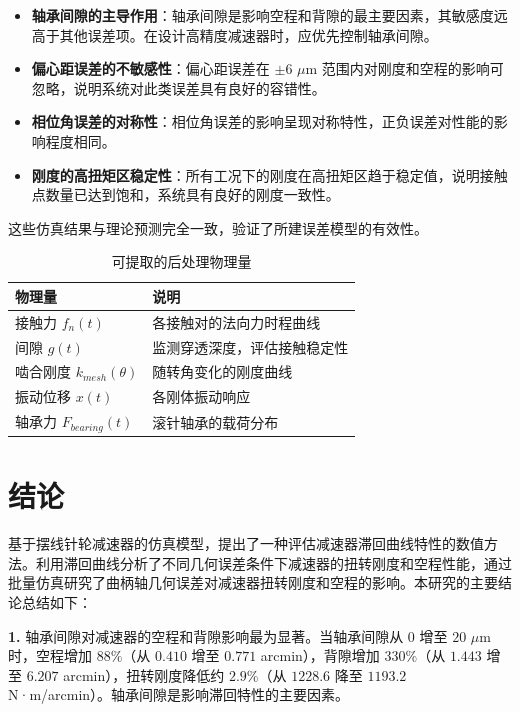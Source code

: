 \documentclass[12pt]{ctexart}
\begin{document}
\begin{itemize}
    \item \textbf{轴承间隙的主导作用}：轴承间隙是影响空程和背隙的最主要因素，其敏感度远高于其他误差项。在设计高精度减速器时，应优先控制轴承间隙。

    \item \textbf{偏心距误差的不敏感性}：偏心距误差在 $\pm 6$ $\mu$m 范围内对刚度和空程的影响可忽略，说明系统对此类误差具有良好的容错性。

    \item \textbf{相位角误差的对称性}：相位角误差的影响呈现对称特性，正负误差对性能的影响程度相同。

    \item \textbf{刚度的高扭矩区稳定性}：所有工况下的刚度在高扭矩区趋于稳定值，说明接触点数量已达到饱和，系统具有良好的刚度一致性。
\end{itemize}

这些仿真结果与理论预测完全一致，验证了所建误差模型的有效性。

\begin{table}[htbp]
\centering
\small
\begin{tabular}{lp{9cm}}
\toprule
物理量 & 说明 \\
\midrule
接触力 $f_n(t)$ & 各接触对的法向力时程曲线 \\
间隙 $g(t)$ & 监测穿透深度，评估接触稳定性 \\
啮合刚度 $k_{mesh}(\theta)$ & 随转角变化的刚度曲线 \\
振动位移 $x(t)$ & 各刚体振动响应 \\
轴承力 $F_{bearing}(t)$ & 滚针轴承的载荷分布 \\
\bottomrule
\end{tabular}
\caption{可提取的后处理物理量}
\end{table}

\section{结论}

基于摆线针轮减速器的仿真模型，提出了一种评估减速器滞回曲线特性的数值方法。利用滞回曲线分析了不同几何误差条件下减速器的扭转刚度和空程性能，通过批量仿真研究了曲柄轴几何误差对减速器扭转刚度和空程的影响。本研究的主要结论总结如下：

\textbf{1.} 轴承间隙对减速器的空程和背隙影响最为显著。当轴承间隙从 $0$ 增至 $20$ $\mu$m 时，空程增加 $88\%$（从 $0.410$ 增至 $0.771$ arcmin），背隙增加 $330\%$（从 $1.443$ 增至 $6.207$ arcmin），扭转刚度降低约 $2.9\%$（从 $1228.6$ 降至 $1193.2$ N·m/arcmin）。轴承间隙是影响滞回特性的主要因素。
\end{document}
